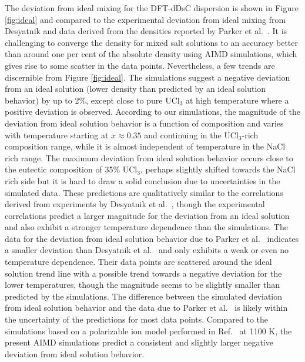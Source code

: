 \documentclass[preprint,3p,10pt,onecolumn,number,sort&compress]{elsarticle}
\begin{document}
{The deviation from ideal mixing for the DFT-dDsC dispersion is shown in Figure \ref{fig:ideal} and compared to the experimental deviation from ideal mixing from Desyatnik \cite{Desyatnik} and data derived from the densities reported by Parker et al.~\cite{Parker}. %
It is challenging to converge the density for mixed salt solutions to an accuracy better than around one per cent of the absolute density using AIMD simulations, which gives rise to some scatter in the data points. Nevertheless, a few trends are discernible from Figure \ref{fig:ideal}. The simulations suggest a negative deviation from an ideal solution (lower density than predicted by an ideal solution behavior) by up to 2\%, except close to pure UCl$_3$ at high temperature where a positive deviation is observed. According to our simulations, the magnitude of the deviation from ideal solution behavior is a function of composition and varies with temperature starting at $x\approx0.35$ and continuing in the UCl$_3$-rich composition range, while it is almost independent of temperature in the NaCl rich range. 
The maximum deviation from ideal solution behavior occurs close to the eutectic composition of 35\% UCl$_3$, perhaps slightly shifted towards the NaCl rich side but it is hard to draw a solid conclusion due to uncertainties in the simulated data. These predictions are qualitatively similar to the correlations derived from experiments by Desyatnik et al.~\cite{Desyatnik}, though the experimental correlations predict a larger magnitude for the deviation from an ideal solution and also exhibit a stronger temperature dependence than the simulations. The data for the deviation from ideal solution behavior due to Parker et al.~\cite{Parker} indicates a smaller deviation than Desyatnik et al.~\cite{Desyatnik} and only exhibits a weak or even no temperature dependence. Their data points are scattered around the ideal solution trend line with a possible trend towards a negative deviation for the lower temperatures, though the magnitude seems to be slightly smaller than predicted by the simulations. The difference between the simulated deviation from ideal solution behavior and the data due to Parker et al.~\cite{Parker} is likely within the uncertainty of the predictions for most data points. Compared to the simulations based on a polarizable ion model performed in Ref.~\cite{VANOUDENAREN2021117470} at 1100 K, the present AIMD simulations predict a consistent and slightly larger negative deviation from ideal solution behavior.

}
\end{document}

